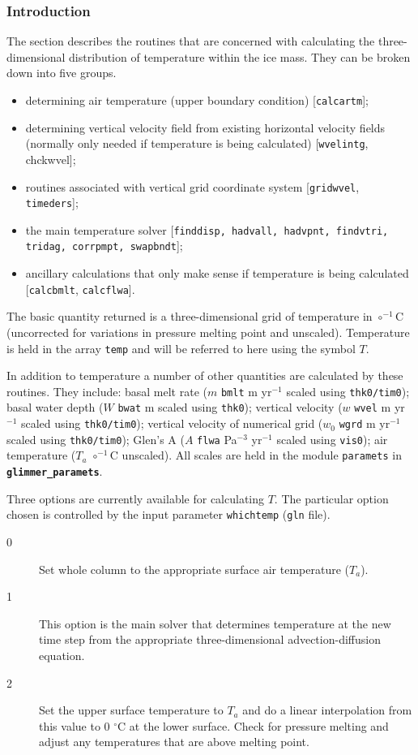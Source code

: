 \subsubsection{Introduction}
The section describes the routines that are concerned with
calculating the three-dimensional distribution of temperature
within the ice mass.  They can be broken down into five groups.
\begin{itemize}
    \item determining air temperature (upper boundary
    condition) [\texttt{calcartm}];
    \item determining vertical velocity field from existing
    horizontal velocity fields (normally only needed if temperature is being calculated) [\texttt{wvelintg}, chckwvel];
    \item routines associated with vertical grid coordinate
    system [\texttt{gridwvel}, \texttt{timeders}];
    \item the main temperature solver [\texttt{finddisp, hadvall, hadvpnt, findvtri, tridag, corrpmpt, swapbndt}];
    \item ancillary calculations that only make sense if temperature is being calculated
    [\texttt{calcbmlt}, \texttt{calcflwa}].
\end{itemize}

The basic quantity returned is a three-dimensional grid of
temperature in $\circ^{-1}$C (uncorrected for variations in
pressure melting point and unscaled).  Temperature is held in the
array \texttt{temp} and will be referred to here using the symbol
$T$.

In addition to temperature a number of other quantities are
calculated by these routines.  They include: basal melt rate ($m$
\texttt{bmlt} m yr$^{-1}$ scaled using \texttt{thk0/tim0}); basal
water depth ($W$ \texttt{bwat} m scaled using \texttt{thk0});
vertical velocity ($w$ \texttt{wvel} m yr$^{-1}$ scaled using
\texttt{thk0/tim0}); vertical velocity of numerical grid ($w_0$
\texttt{wgrd} m yr$^{-1}$ scaled using \texttt{thk0/tim0}); Glen's
A ($A$ \texttt{flwa} Pa$^{-3}$ yr$^{-1}$ scaled using
\texttt{vis0}); air temperature ($T_a$ $\circ^{-1}$C unscaled).
All scales are held in the module \texttt{paramets} in
\textbf{\texttt{glimmer\_paramets}}.

Three options are currently available for calculating $T$. The
particular option chosen is controlled by the input parameter
\texttt{whichtemp} (\texttt{gln} file).

\begin{description}
    \item[0] Set whole column to the appropriate surface air temperature ($T_a$).
    \item[1] This option is the main solver that determines temperature
    at the new time step from the appropriate three-dimensional
    advection-diffusion equation.
    \item[2] Set the upper surface temperature to $T_a$ and do a linear
    interpolation from this value to 0 $^\circ$C at the lower
    surface. Check for pressure melting and adjust any
    temperatures that are above melting point.
\end{description}

